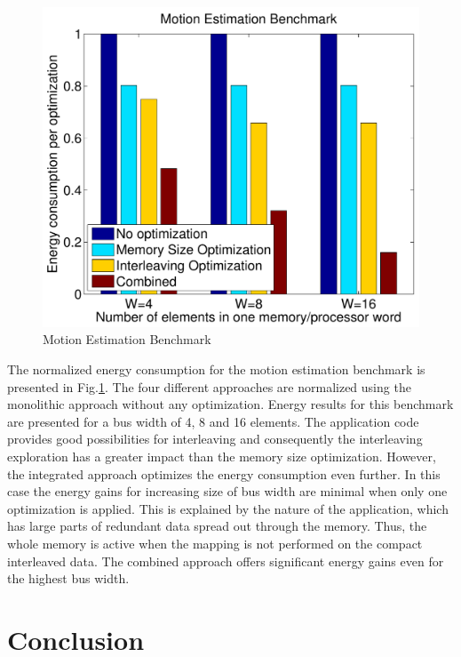 \begin{figure}
\centering
	\includegraphics[scale = 0.5]{D/Images/mest.pdf} 
	\caption{Motion Estimation Benchmark}
	\label{fig:mest}
\end{figure}

The normalized energy consumption for the motion estimation benchmark is presented in Fig.\ref{fig:mest}.
The four different approaches are normalized using the monolithic approach without any optimization.
Energy results for this benchmark are presented for a bus width of 4, 8 and 16 elements.
The application code provides good possibilities for interleaving and consequently the interleaving exploration has a greater impact than the memory size optimization.
However, the integrated approach optimizes the energy consumption even further.
In this case the energy gains for increasing size of bus width are minimal when only one optimization is applied.
This is explained by the nature of the application, which has large parts of redundant data spread out through the memory.
Thus, the whole memory is active when the mapping is not performed on the compact interleaved data.
The combined approach offers significant energy gains even for the highest bus width. 

\section{Conclusion}
\label{sec:conclusionD}

